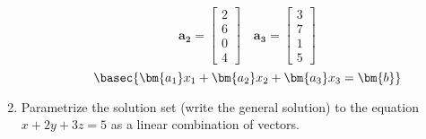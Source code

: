 \documentclass[basic]{inVerba-notes}
\begin{document}
\begin{enumerate}
\begin{enumerate}
{\[    \bm{a_2} = \begin{bmatrix} 2 \\ 6 \\ 0 \\ 4 \end{bmatrix}\quad
    \bm{a_3} = \begin{bmatrix} 3 \\ 7 \\ 1 \\ 5 \end{bmatrix}
    \]}%
    \[%
    \basec{\bm{a_1}x_1 + \bm{a_2}x_2 + \bm{a_3}x_3 = \bm{b}}
    \]%
  \end{enumerate}

  \item Parametrize the solution set (write the general solution) to the equation \(x+2y+3z=5\) as a linear combination of vectors.
  \basec{\[%
  \begin{bmatrix} x_1 \\ x_2 \\ x_3 \end{bmatrix}
  =
  \begin{bmatrix} 5 \\ 0 \\ 0 \end{bmatrix}
  + 
  s\begin{bmatrix} -2 \\ 1 \\ 0 \end{bmatrix}
  +
  t\begin{bmatrix} -3 \\ 0 \\ 1 \end{bmatrix}
  \]}%
  
\end{enumerate}
\end{document}
